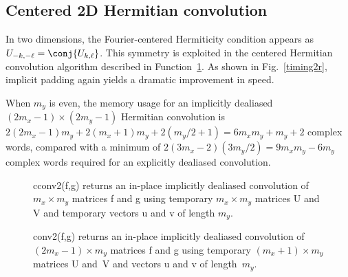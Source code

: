 \documentclass[final]{siamltex}
\begin{document}
\subsection{Centered 2D Hermitian convolution}

In two dimensions, the Fourier-centered Hermiticity condition appears as
$U_{-k,-\ell}=\conj{U_{k,\ell}}$. 
This symmetry is exploited in the centered Hermitian convolution
algorithm described in Function~{\tt\ref{conv2}}. As shown in
Fig.~\ref{timing2r}, implicit padding again yields a dramatic improvement
in speed.

When $m_y$ is even, the memory usage for an implicitly dealiased
$(2m_x-1)\times (2m_y-1)$ Hermitian convolution is
$2(2m_x-1)m_y+2(m_x+1)m_y+2(m_y/2+1)=6m_xm_y+m_y+2$ complex words, compared
with a minimum of $2(3m_x-2)(3m_y/2)=9m_xm_y-6m_y$ complex words required
for an explicitly dealiased convolution.

\begin{figure}[htbp]
\begin{minipage}{0.5\linewidth}
\begin{function}[H]
  \Return \xf\;
\caption{cconv2({\sf f},{\sf g}) 
returns an in-place implicitly dealiased convolution of
\hbox{$m_x\times m_y$} matrices {\sf f} and {\sf g} using temporary 
\hbox{$m_x\times m_y$}
matrices {\sf U} and {\sf V} and temporary vectors {\sf u} and {\sf v} of
length $m_y$.}\label{cconv2}
\end{function}
\end{minipage}
%
\begin{minipage}{0.5\linewidth}
\begin{function}[H]
  \Return \xf\;
\caption{conv2({\sf f},{\sf g}) 
returns an in-place implicitly dealiased convolution of $(2m_x-1)\times
m_y$ matrices {\sf f} and {\sf g} using temporary $(m_x+1)\times m_y$ matrices 
{\sf U} and~{\sf V} and vectors {\sf u} and {\sf v} of length~$m_y$.
}\label{conv2}
\end{function}
\end{minipage}
\end{figure}
\end{document}
